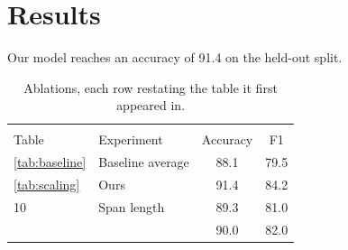 \documentclass{article}
\begin{document}
\section{Results}

Our model reaches an accuracy of 91.4 on the held-out split.

\begin{table}
\caption{Ablations, each row restating the table it first appeared in.}
\begin{tabular}{llcc}
\Xhline{1.0pt}
\multicolumn{4}{c}{(a) Ablations restated} \\
Table & Experiment & \fontsize{7.5pt}{1em}\selectfont Accuracy & F1 \\
\midrule
\ref{tab:baseline} & Baseline average & 88.1 & 79.5 \\
\Xhline{0.3\arrayrulewidth}
\autoref{tab:scaling} & Ours & 91.4 & 84.2 \\
10 & Span length & 89.3 & 81.0 \\
 & & 90.0 & 82.0 \\
\bottomrule
\end{tabular}
\end{table}
\end{document}
